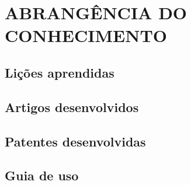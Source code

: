 \chapter{ABRANGÊNCIA DO CONHECIMENTO}
\label{chap:abrconhec}

\section{Lições aprendidas}
\label{sec:lic}

\section{Artigos desenvolvidos}
\label{sec:art}

\section{Patentes desenvolvidas}
\label{sec:pat}

\section{Guia de uso}
\label{sec:guiuso}


